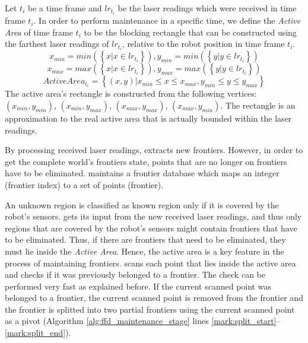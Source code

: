 	Let $t_i$ be a time frame and $lr_{t_i}$ be the laser readings which
	were received in time frame $t_i$. In order to perform maintenance in a specific
	time, we define the \emph{Active Area} of time frame $t_i$ to be the blocking
	rectangle that can be constructed using the farthest laser readings of
	$lr_{t_i}$, relative to the robot position in time frame $t_i$. 
	$$ x_{min} = min(\left\{x | x \in lr_{t_i} \right\}) ,
	 y_{min} = min(\left\{y | y \in lr_{t_i} \right\}) $$ 
	$$ x_{max} = max(\left\{x | x \in lr_{t_i} \right\}) ,
	 y_{max} = max(\left\{y | y \in lr_{t_i} \right\}) $$ 
	$$ActiveArea_{t_i} = \left\{\left(x,y \right) | x_{min}  \leq x \leq x_{max} ,
	y_{min}  \leq y \leq y_{max} \right\}$$ 
	The active area's rectangle is constructed from the following vertices: 
	$\left(x_{min},y_{min} \right)$,
	        $\left(x_{min},y_{max} \right)$,
	        $\left(x_{max},y_{max} \right)$,
	        $\left(x_{max},y_{min} \right)$. 
	The rectangle is an approximation to the real active area that is actually
	bounded within the laser readings. 

	By processing received laser readings, \FFD extracts new frontiers.
	However, in order to get the complete world's frontiers state, points
	that are no longer on frontiers have to be eliminated. \FFD maintains a frontier
	database which maps an integer (frontier index) to a set of points (frontier).
	
	An unknown region is classified as known region only if it is covered by the
	robot's sensors. \FFD gets its input from the new received
	laser readings, and thus only regions that are covered by the
	robot's sensors might contain frontiers that have to be eliminated. Thus, if there are frontiers that need to be eliminated, they must
	lie inside the \emph{Active Area}. Hence, the active area is a key feature
	in the process of maintaining frontiers. \FFD scans each point that lies inside
	the active area and checks if it was previously belonged to a frontier. The
	check can be performed very fast as explained before. If the current scanned
	point was belonged to a frontier, the current scanned point is removed from
	the frontier and the frontier is splitted into two partial frontiers using the
	current scanned point as a pivot (Algorithm \ref{alg:ffd_maintenance_stage} lines
	\ref{mark:split_start}--\ref{mark:split_end}).
 
